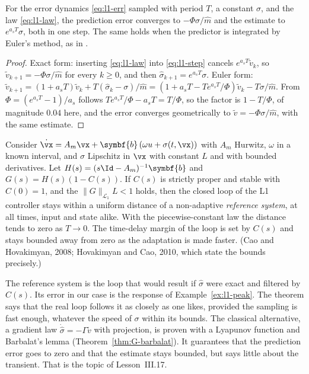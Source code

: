 \begin{theorem}
\label{thm:l1-ss}
For the error dynamics \cref{eq:l1-err} sampled with period $T$, a constant $\sigma$, and the law \cref{eq:l1-law}, the prediction error converges to $-\Phi\sigma/\hat m$ and the estimate to $e^{a_sT}\sigma$, both in one step. The same holds when the predictor is integrated by Euler's method, as in .
\end{theorem}
\begin{proof}
Exact form: inserting \cref{eq:l1-law} into \cref{eq:l1-step} cancels $e^{a_sT}\tilde v_k$, so $\tilde v_{k+1} = -\Phi\sigma/\hat m$ for every $k \ge 0$, and then $\hat\sigma_{k+1} = e^{a_sT}\sigma$. Euler form: $\tilde v_{k+1} = (1 + a_sT)\tilde v_k + T(\hat\sigma_k - \sigma)/\hat m = (1 + a_sT - Te^{a_sT}/\Phi)\tilde v_k - T\sigma/\hat m$. From $\Phi = (e^{a_sT} - 1)/a_s$ follows $Te^{a_sT}/\Phi - a_sT = T/\Phi$, so the factor is $1 - T/\Phi$, of magnitude $0.04$ here, and the error converges geometrically to $\tilde v = -\Phi\sigma/\hat m$, with the same estimate.
\end{proof}

\begin{theorem}
\label{thm:l1-bounds}
Consider $\dot{\vx} = A_m\vx + \symbf{b}\,(\omega u + \sigma(t, \vx))$ with $A_m$ Hurwitz, $\omega$ in a known interval, and $\sigma$ Lipschitz in $\vx$ with constant $L$ and with bounded derivatives. Let $H(s) = (s\Id - A_m)^{-1}\symbf{b}$ and $G(s) = H(s)(1 - C(s))$. If $C(s)$ is strictly proper and stable with $C(0) = 1$, and the  $\|G\|_{\mathcal L_1}L < 1$ holds, then the closed loop of the L1 controller stays within a uniform distance of a non-adaptive \emph{reference system}, at all times, input and state alike. With the piecewise-constant law the distance tends to zero as $T \to 0$. The time-delay margin of the loop is set by $C(s)$ and stays bounded away from zero as the adaptation is made faster. (Cao and Hovakimyan, 2008; Hovakimyan and Cao, 2010, which state the bounds precisely.)
\end{theorem}

The reference system is the loop that would result if $\hat\sigma$ were exact and filtered by $C(s)$. Its error in our case is the response of Example~\ref{ex:l1-peak}. The theorem says that the real loop follows it as closely as one likes, provided the sampling is fast enough, whatever the speed of $\sigma$ within its bounds. The classical alternative, a gradient law $\dot{\hat\sigma} = -\Gamma\tilde v$ with projection, is proven with a Lyapunov function and Barbalat's lemma (Theorem~\ref{thm:G-barbalat}). It guarantees that the prediction error goes to zero and that the estimate stays bounded, but says little about the transient. That is the topic of Lesson~III.17.


